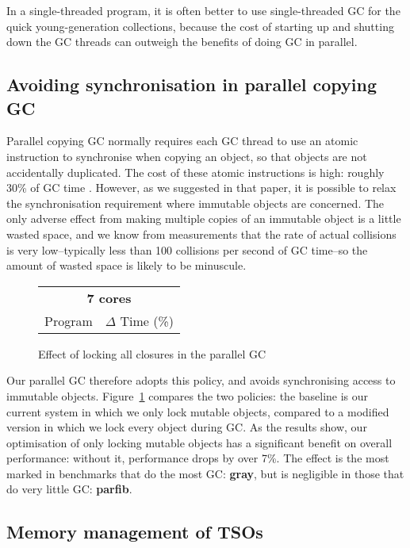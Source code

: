 \documentclass[twocolumn,9pt]{sigplanconf}
\begin{document}
In a single-threaded program, it is often better to use
single-threaded GC for the quick young-generation collections, because
the cost of starting up and shutting down the GC threads can outweigh
the benefits of doing GC in parallel.

\subsection{Avoiding synchronisation in parallel copying GC}

Parallel copying GC normally requires each GC thread to use an atomic
instruction to synchronise when copying an object, so that objects are
not accidentally duplicated.  The cost of these atomic instructions is
high: roughly 30\% of GC time \cite{parallel-gc-08}.  However, as we
suggested in that paper, it is possible to relax the synchronisation
requirement where immutable objects are concerned.  The only adverse
effect from making multiple copies of an immutable object is a little
wasted space, and we know from measurements that the rate of actual
collisions is very low--typically less than 100 collisions per second
of GC time--so the amount of wasted space is likely to be minuscule.

\begin{figure}
\begin{center}
\begin{tabular}{lr}
\hline
\multicolumn{2}{c}{\textbf{7 cores}} \\
Program & $\Delta$ Time (\%) \\
\hline

\hline
\end{tabular}
\end{center}
\caption{Effect of locking all closures in the parallel GC}
\label{f:gclock}
\end{figure}

Our parallel GC therefore adopts this policy, and avoids synchronising
access to immutable objects.  Figure~\ref{f:gclock} compares the two
policies: the baseline is our current system in which we only lock
mutable objects, compared to a modified version in which we lock every
object during GC.  As the results show, our optimisation of only
locking mutable objects has a significant benefit on overall
performance: without it, performance drops by over 7\%.  The effect is
the most marked in benchmarks that do the most GC: \textbf{gray}, but
is negligible in those that do very little GC: \textbf{parfib}.

\subsection{Memory management of TSOs}
\end{document}
